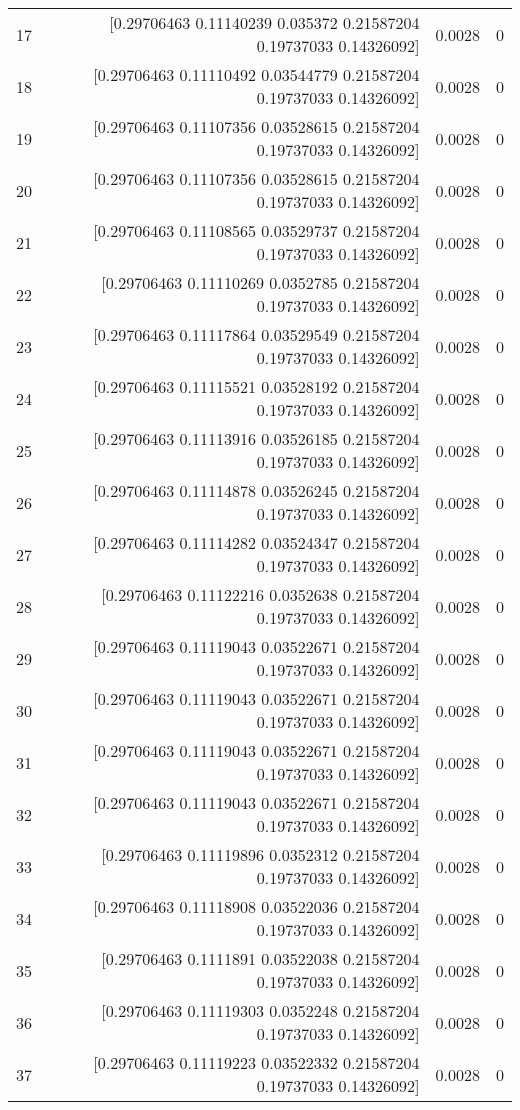 \begin{longtable}{lrrr}
17 & [0.29706463 0.11140239 0.035372   0.21587204 0.19737033 0.14326092] & 0.0028 & 0 \\
18 & [0.29706463 0.11110492 0.03544779 0.21587204 0.19737033 0.14326092] & 0.0028 & 0 \\
19 & [0.29706463 0.11107356 0.03528615 0.21587204 0.19737033 0.14326092] & 0.0028 & 0 \\
20 & [0.29706463 0.11107356 0.03528615 0.21587204 0.19737033 0.14326092] & 0.0028 & 0 \\
21 & [0.29706463 0.11108565 0.03529737 0.21587204 0.19737033 0.14326092] & 0.0028 & 0 \\
22 & [0.29706463 0.11110269 0.0352785  0.21587204 0.19737033 0.14326092] & 0.0028 & 0 \\
23 & [0.29706463 0.11117864 0.03529549 0.21587204 0.19737033 0.14326092] & 0.0028 & 0 \\
24 & [0.29706463 0.11115521 0.03528192 0.21587204 0.19737033 0.14326092] & 0.0028 & 0 \\
25 & [0.29706463 0.11113916 0.03526185 0.21587204 0.19737033 0.14326092] & 0.0028 & 0 \\
26 & [0.29706463 0.11114878 0.03526245 0.21587204 0.19737033 0.14326092] & 0.0028 & 0 \\
27 & [0.29706463 0.11114282 0.03524347 0.21587204 0.19737033 0.14326092] & 0.0028 & 0 \\
28 & [0.29706463 0.11122216 0.0352638  0.21587204 0.19737033 0.14326092] & 0.0028 & 0 \\
29 & [0.29706463 0.11119043 0.03522671 0.21587204 0.19737033 0.14326092] & 0.0028 & 0 \\
30 & [0.29706463 0.11119043 0.03522671 0.21587204 0.19737033 0.14326092] & 0.0028 & 0 \\
31 & [0.29706463 0.11119043 0.03522671 0.21587204 0.19737033 0.14326092] & 0.0028 & 0 \\
32 & [0.29706463 0.11119043 0.03522671 0.21587204 0.19737033 0.14326092] & 0.0028 & 0 \\
33 & [0.29706463 0.11119896 0.0352312  0.21587204 0.19737033 0.14326092] & 0.0028 & 0 \\
34 & [0.29706463 0.11118908 0.03522036 0.21587204 0.19737033 0.14326092] & 0.0028 & 0 \\
35 & [0.29706463 0.1111891  0.03522038 0.21587204 0.19737033 0.14326092] & 0.0028 & 0 \\
36 & [0.29706463 0.11119303 0.0352248  0.21587204 0.19737033 0.14326092] & 0.0028 & 0 \\
37 & [0.29706463 0.11119223 0.03522332 0.21587204 0.19737033 0.14326092] & 0.0028 & 0 \\

\end{longtable}
